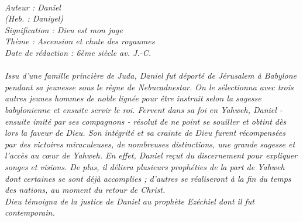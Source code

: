 \BFont
\noindent\hrulefill
{\footnotesize
\textit{
\bigskip
{\centering{}
\\Auteur : Daniel
\\(Heb. : Daniyel)
\\Signification : Dieu est mon juge
\\Thème : Ascension et chute des royaumes
\\Date de rédaction : 6ème siècle av. J.-C.\\}
}
\textit{
\\Issu d’une famille princière de Juda, Daniel fut déporté de Jérusalem à Babylone pendant sa jeunesse sous le règne de Nebucadnestar. On le sélectionna avec trois autres jeunes hommes de noble lignée pour être instruit selon la sagesse babylonienne et ensuite servir le roi. Fervent dans sa foi en Yahweh, Daniel - ensuite imité par ses compagnons - résolut de ne point se souiller et obtint dès lors la faveur de Dieu. Son intégrité et sa crainte de Dieu furent récompensées par des victoires miraculeuses, de nombreuses distinctions, une grande sagesse et l’accès au cœur de Yahweh. En effet, Daniel reçut du discernement pour expliquer songes et visions. De plus, il délivra plusieurs prophéties de la part de Yahweh dont certaines se sont déjà accomplies ; d’autres se réaliseront à la fin du temps des nations, au moment du retour de Christ.
\\Dieu témoigna de la justice de Daniel au prophète Ezéchiel dont il fut contemporain.\bigskip
}
}
\par\nobreak\noindent\hrulefill
